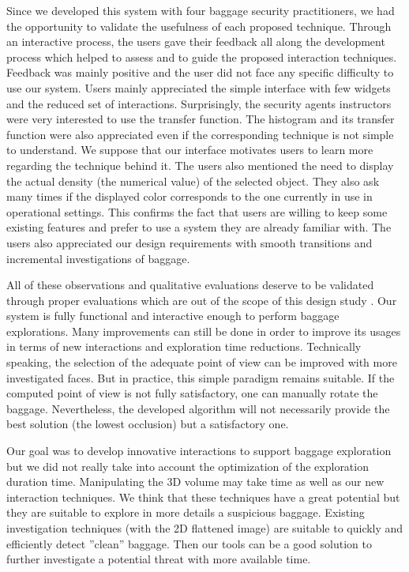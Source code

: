 Since we developed this system with four baggage security practitioners, we had the opportunity to validate the usefulness of each proposed technique. Through an interactive process, the users gave their feedback all along the development process which helped to assess and to guide the proposed interaction techniques. Feedback was mainly positive and the user did not face any specific difficulty to use our system. Users mainly appreciated the simple interface with few widgets and the reduced set of interactions. Surprisingly, the security agents instructors were very interested to use the transfer function. The histogram and its transfer function were also appreciated even if the corresponding technique is not simple to understand. We suppose that our interface motivates users to learn more regarding the technique behind it. The users also mentioned the need to display the actual density (the numerical value) of the selected object. They also ask many times if the displayed color corresponds to the one currently in use in operational settings. This confirms the fact that users are willing to keep some existing features and prefer to use a system they are already familiar with.
The users also appreciated our design requirements with smooth transitions and incremental investigations of baggage.
\par All of these observations and qualitative evaluations deserve to be validated through proper evaluations which are out of the scope of this design study .
Our system is fully functional and interactive enough to perform baggage explorations. Many improvements can still be done in order to improve its usages in terms of new interactions and exploration time reductions.
Technically speaking, the selection of the adequate point of view can be improved with more investigated faces. But in practice, this simple paradigm remains suitable. If the computed point of view is not fully satisfactory, one can manually rotate the baggage. Nevertheless, the developed algorithm will not necessarily provide the best solution (the lowest occlusion) but a satisfactory one.
\par Our goal was to develop innovative interactions to support baggage exploration but we did not really take into account the optimization of the exploration duration time. Manipulating the 3D volume may take time as well as our new interaction techniques. We think that these techniques have a great potential but they are suitable to explore in more details a suspicious baggage. Existing investigation techniques (with the 2D flattened image) are suitable to quickly and efficiently detect ''clean'' baggage. Then our tools can be a good solution to further investigate a potential threat with more available time.



